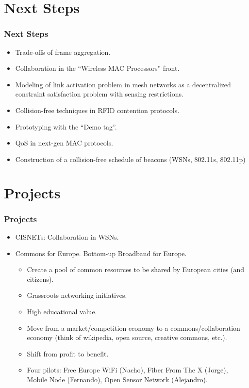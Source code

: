 \documentclass{beamer}
\begin{document}
\section{Next Steps}
\begin{frame}
  \frametitle{Next Steps}
      \begin{block}{}
        \begin{itemize}
          \item \alert<2>{Trade-offs of frame aggregation.}
          \item Collaboration in the ``Wireless MAC Processors'' front.
          \item Modeling of link activation problem in mesh networks as a decentralized constraint satisfaction problem with sensing restrictions.
          \item Collision-free techniques in RFID contention protocols.
          \item Prototyping with the ``Demo tag''.
          \item QoS in next-gen MAC protocols.
          \item Construction of a collision-free schedule of beacons (WSNs, 802.11s, 802.11p)
        \end{itemize}
      \end{block}
\end{frame}


\section{Projects}
\begin{frame}
  \frametitle{Projects}
      \begin{block}{}
        \begin{itemize}
          \item CISNETs: Collaboration in WSNs.
          \item Commons for Europe. Bottom-up Broadband for Europe.          \begin{itemize}
              \item Create a pool of common resources to be shared by European cities (and citizens).
              \item Grassroots networking initiatives.
              \item High educational value.
              \item Move from a market/competition economy to a commons/collaboration economy (think of wikipedia, open source, creative commons, etc.).
              \item Shift from profit to benefit.
              \item Four pilots: Free Europe WiFi (Nacho), Fiber From The X (Jorge), Mobile Node (Fernando), Open Sensor Network (Alejandro).
          \end{itemize}
        \end{itemize}
      \end{block}
\end{frame}
\end{document}
